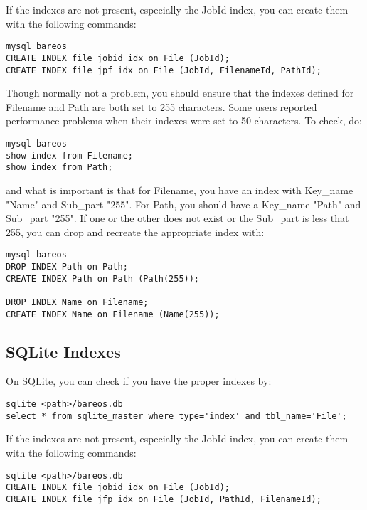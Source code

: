 If the indexes are not present, especially the JobId index, you can
create them with the following commands:

\footnotesize
\begin{verbatim}
mysql bareos
CREATE INDEX file_jobid_idx on File (JobId);
CREATE INDEX file_jpf_idx on File (JobId, FilenameId, PathId);
\end{verbatim}
\normalsize

Though normally not a problem, you should ensure that the indexes
defined for Filename and Path are both set to 255 characters. Some users
reported performance problems when their indexes were set to 50 characters.
To check, do:

\footnotesize
\begin{verbatim}
mysql bareos
show index from Filename;
show index from Path;
\end{verbatim}
\normalsize

and what is important is that for Filename, you have an index with
Key\_name "Name" and Sub\_part "255". For Path, you should have a Key\_name
"Path" and Sub\_part "255".  If one or the other does not exist or the
Sub\_part is less that 255, you can drop and recreate the appropriate
index with:

\footnotesize
\begin{verbatim}
mysql bareos
DROP INDEX Path on Path;
CREATE INDEX Path on Path (Path(255));

DROP INDEX Name on Filename;
CREATE INDEX Name on Filename (Name(255));
\end{verbatim}
\normalsize


\subsection{SQLite Indexes}
On SQLite, you can check if you have the proper indexes by:

\footnotesize
\begin{verbatim}
sqlite <path>/bareos.db
select * from sqlite_master where type='index' and tbl_name='File';
\end{verbatim}
\normalsize

If the indexes are not present, especially the JobId index, you can
create them with the following commands:

\footnotesize
\begin{verbatim}
sqlite <path>/bareos.db
CREATE INDEX file_jobid_idx on File (JobId);
CREATE INDEX file_jfp_idx on File (JobId, PathId, FilenameId);
\end{verbatim}
\normalsize



